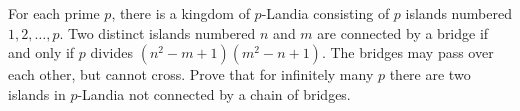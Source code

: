 For each prime $p$, there is a kingdom of $p$-Landia consisting of $p$ islands numbered $1, 2, \ldots, p$. Two distinct islands numbered $n$ and $m$ are connected by a bridge if and only if $p$ divides $(n^2 - m + 1)(m^2 - n + 1)$. The bridges may pass over each other, but cannot cross. Prove that for infinitely many $p$ there are two islands in $p$-Landia not connected by a chain of bridges.
